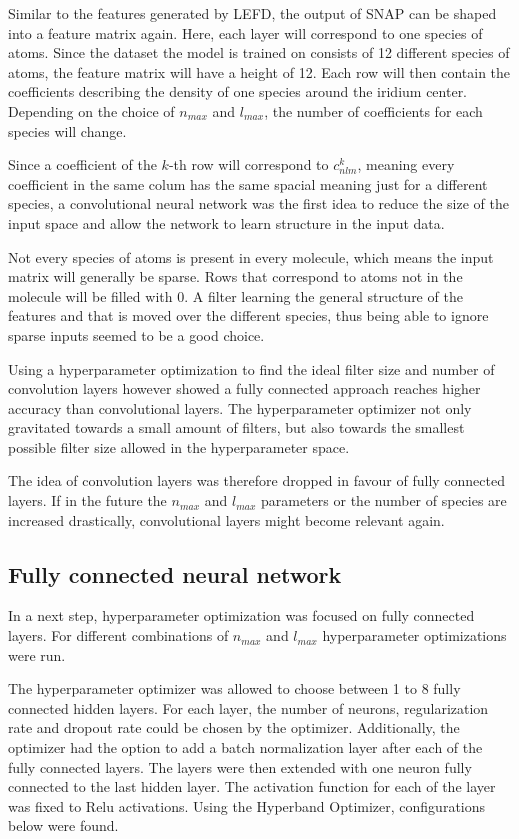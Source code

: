 Similar to the features generated by LEFD, the output of SNAP can be shaped into a feature matrix again.
Here, each layer will correspond to one species of atoms.
Since the dataset the model is trained on consists of 12 different species of atoms, the feature matrix will have a height of 12.
Each row will then contain the coefficients describing the density of one species around the iridium center.
Depending on the choice of $n_{max}$ and $l_{max}$, the number of coefficients for each species will change.

Since a coefficient of the $k$-th row will correspond to $c^k_{nlm}$, meaning every coefficient in the same colum has the same spacial meaning just for a different species,
a convolutional neural network was the first idea to reduce the size of the input space and allow the network to learn structure in the input data.

Not every species of atoms is present in every molecule, which means the input matrix will generally be sparse.
Rows that correspond to atoms not in the molecule will be filled with 0.
A filter learning the general structure of the features and that is moved over the different species, thus
being able to ignore sparse inputs seemed to be a good choice.

Using a hyperparameter optimization to find the ideal filter size and number of convolution layers however showed
a fully connected approach reaches higher accuracy than convolutional layers.
The hyperparameter optimizer not only gravitated towards a small amount of filters, but also towards 
the smallest possible filter size allowed in the hyperparameter space.

The idea of convolution layers was therefore dropped in favour of fully connected layers.
If in the future the $n_{max}$ and $l_{max}$ parameters or the number of species are increased drastically, 
convolutional layers might become relevant again.

\subsection{Fully connected neural network}

In a next step, hyperparameter optimization was focused on fully connected layers.
For different combinations of $n_{max}$ and $l_{max}$ hyperparameter optimizations were run.

The hyperparameter optimizer was allowed to choose between 1 to 8 fully connected hidden layers.
For each layer, the number of neurons, regularization rate and dropout rate could be chosen by the optimizer.
Additionally, the optimizer had the option to add a batch normalization layer after each of the fully connected layers.
The layers were then extended with one neuron fully connected to the last hidden layer.
The activation function for each of the layer was fixed to Relu activations.
Using the Hyperband Optimizer, configurations below were found.

